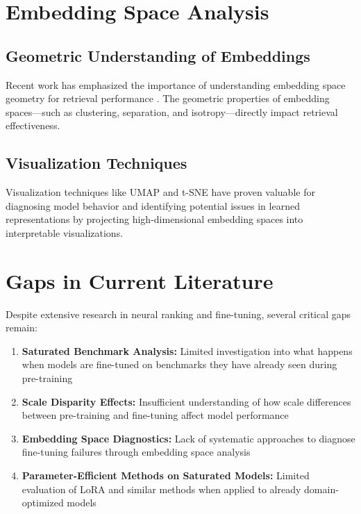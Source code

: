 \section{Embedding Space Analysis}

\subsection{Geometric Understanding of Embeddings}

Recent work has emphasized the importance of understanding embedding space geometry for retrieval performance \cite{reimers2019sentence}. The geometric properties of embedding spaces—such as clustering, separation, and isotropy—directly impact retrieval effectiveness.

\subsection{Visualization Techniques}

Visualization techniques like UMAP \cite{mcinnes2018umap} and t-SNE \cite{maaten2008visualizing} have proven valuable for diagnosing model behavior and identifying potential issues in learned representations by projecting high-dimensional embedding spaces into interpretable visualizations.

\section{Gaps in Current Literature}

Despite extensive research in neural ranking and fine-tuning, several critical gaps remain:

\begin{enumerate}
\item \textbf{Saturated Benchmark Analysis:} Limited investigation into what happens when models are fine-tuned on benchmarks they have already seen during pre-training
\item \textbf{Scale Disparity Effects:} Insufficient understanding of how scale differences between pre-training and fine-tuning affect model performance
\item \textbf{Embedding Space Diagnostics:} Lack of systematic approaches to diagnose fine-tuning failures through embedding space analysis
\item \textbf{Parameter-Efficient Methods on Saturated Models:} Limited evaluation of LoRA and similar methods when applied to already domain-optimized models
\end{enumerate}

